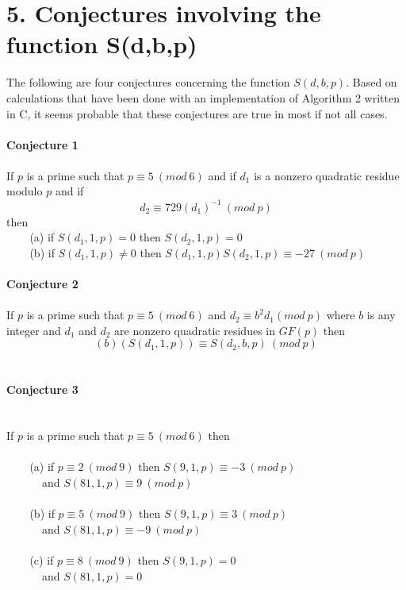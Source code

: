 \documentclass[final,letterpaper,oneside,10pt]{article}
\begin{document}
\section*{5. Conjectures involving the function S(d,b,p) }


The following are four conjectures concerning the function $S(d,b,p)$.  Based on calculations that have been done with an implementation of 
Algorithm 2 written in C, it seems probable that these conjectures are true in most if not all cases.
\\
\\
\textbf{Conjecture 1}
\\
\\
If $p$ is a prime such that $p \equiv 5~(mod~6)$ and if $d_1$ is a nonzero quadratic residue modulo $p$ and if
\[d_2 \equiv 729(d_1)^{-1}~(mod~p)\]
then
\\
$~~~~~~~~$ (a) if $S(d_1,1,p)=0$ then $S(d_2,1,p)=0$
\\
$~~~~~~~~$  (b) if $ S(d_1,1,p) \ne 0$ then $S(d_1,1,p)S(d_2,1,p) \equiv -27~(mod~p)$
\\
\\
\textbf{Conjecture 2}
\\
\\
If $p$ is a prime such that $p \equiv 5~(mod~6)$ and $d_2 \equiv b^2d_1(mod~p)$ where $b$ is any integer and $d_1$ and $d_2$ are 
nonzero quadratic residues in $GF(p)$ then
\\
\[(b)(S(d_1,1,p)) \equiv S(d_2,b,p)~(mod~p)\]
\\
\\
\textbf{Conjecture 3}
\\
\\
\\
If $p$ is a prime such that $p \equiv 5~(mod~6)$ then
\\
\\
$~~~~~~~~$ (a) if $p \equiv 2~(mod~9)$ then $S(9,1,p) \equiv -3~(mod~p)$ 
\\
$~~~~~~~~~~~~~$ and $S(81,1,p) \equiv 9~(mod~p)$
\\
\\
$~~~~~~~~$ (b) if $p \equiv 5~(mod~9)$ then $S(9,1,p) \equiv 3~(mod~p)$ 
\\
$~~~~~~~~~~~~~$ and $S(81,1,p) \equiv -9~(mod~p)$
\\
\\
$~~~~~~~~$ (c) if $p \equiv 8~(mod~9)$ then $S(9,1,p) = 0$ 
\\
$~~~~~~~~~~~~~$ and $S(81,1,p) =0$
\\
\\
\end{document}
